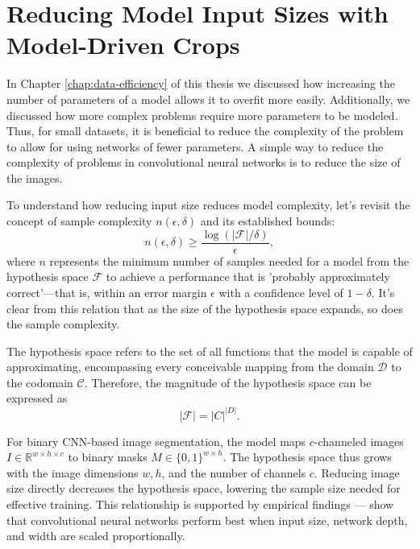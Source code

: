 
\chapter{Reducing Model Input Sizes with Model-Driven Crops}
\label{chap:reducing-input-size}

In Chapter \ref{chap:data-efficiency} of this thesis we discussed how increasing the number of parameters of a model allows it to overfit more easily. Additionally, we discussed how more complex problems require more parameters to be modeled. Thus, for small datasets, it is beneficial to reduce the complexity of the problem to allow for using networks of fewer parameters. A simple way to reduce the complexity of problems in convolutional neural networks is to reduce the size of the images.

To understand how reducing input size reduces model complexity, let's revisit the concept of sample complexity \(n(\epsilon, \delta)\) and its established bounds:
\begin{equation}
	n(\epsilon, \delta) \geq \frac{\log(\lvert \mathcal{F} \rvert / \delta)}{\epsilon},
\end{equation}
where \(n\) represents the minimum number of samples needed for a model from the hypothesis space \(\mathcal{F}\) to achieve a performance that is 'probably approximately correct'—that is, within an error margin \(\epsilon\) with a confidence level of \(1 - \delta\). It's clear from this relation that as the size of the hypothesis space expands, so does the sample complexity.

The hypothesis space refers to the set of all functions that the model is capable of approximating, encompassing every conceivable mapping from the domain \(\mathcal{D}\) to the codomain \(\mathcal{C}\). Therefore, the magnitude of the hypothesis space can be expressed as
\begin{equation}
	\lvert \mathcal{F} \rvert = {\lvert C \rvert}^{\lvert D \rvert}.
\end{equation}

For binary CNN-based image segmentation, the model maps \(c\)-channeled images \(I \in \mathbb{R}^{w \times h \times c}\) to binary masks \(M \in \{0, 1\}^{w \times h}\). The hypothesis space thus grows with the image dimensions \(w, h\), and the number of channels \(c\). Reducing image size directly decreases the hypothesis space, lowering the sample size needed for effective training. This relationship is supported by empirical findings --- \citet{tanEfficientNetRethinkingModel2020} show that convolutional neural networks perform best when input size, network depth, and width are scaled proportionally.

